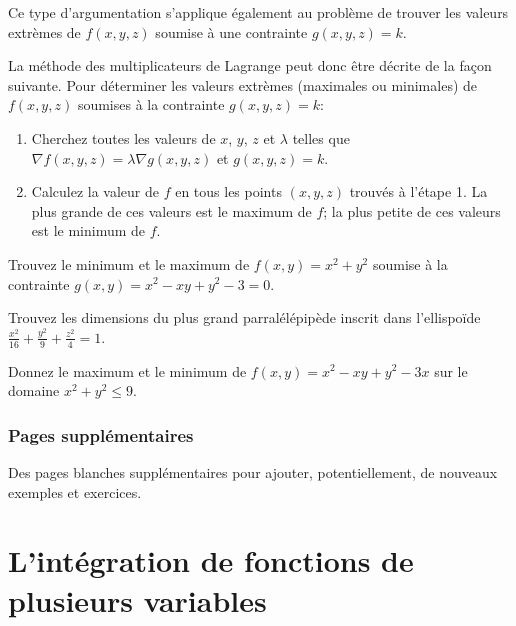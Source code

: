 \documentclass[]{book}
\theoremstyle{definition}
\theoremstyle{definition}
\theoremstyle{definition}
\theoremstyle{remark}
\let\BeginKnitrBlock\begin \let\EndKnitrBlock\end
\begin{document}
Ce type d'argumentation s'applique également au problème de trouver les
valeurs extrèmes de \(f(x,y,z)\) soumise à une contrainte
\(g(x,y,z)=k\).

La méthode des multiplicateurs de Lagrange peut donc être décrite de la
façon suivante. Pour déterminer les valeurs extrèmes (maximales ou
minimales) de \(f(x,y,z)\) soumises à la contrainte \(g(x,y,z)=k\):

\begin{enumerate}
\def\labelenumi{\arabic{enumi}.}
\item
  Cherchez toutes les valeurs de \(x\), \(y\), \(z\) et \(\lambda\)
  telles que \(\nabla f(x,y,z) = \lambda \nabla g(x,y,z)\) et
  \(g(x,y,z)=k\).
\item
  Calculez la valeur de \(f\) en tous les points \((x,y,z)\) trouvés à
  l'étape 1. La plus grande de ces valeurs est le maximum de \(f\); la
  plus petite de ces valeurs est le minimum de \(f\).
\end{enumerate}

\BeginKnitrBlock{example}
\protect\hypertarget{exm:unnamed-chunk-235}{}{\label{exm:unnamed-chunk-235}
}Trouvez le minimum et le maximum de \(f(x,y)=x^2+y^2\) soumise à la
contrainte \(g(x,y)=x^2-xy+y^2-3=0\).
\EndKnitrBlock{example}
\vspace*{8cm}

\BeginKnitrBlock{example}
\protect\hypertarget{exm:unnamed-chunk-236}{}{\label{exm:unnamed-chunk-236}
}Trouvez les dimensions du plus grand parralélépipède inscrit dans
l'ellispoïde \(\frac{x^2}{16}+\frac{y^2}{9}+\frac{z^2}{4}=1\).
\EndKnitrBlock{example}
\vspace*{8cm}

\BeginKnitrBlock{example}
\protect\hypertarget{exm:unnamed-chunk-237}{}{\label{exm:unnamed-chunk-237}
}Donnez le maximum et le minimum de \(f(x,y)=x^2-xy+y^2-3x\) sur le
domaine \(x^2+y^2\leq 9\).
\EndKnitrBlock{example}
\vspace*{8cm}

\hypertarget{pages-supplementaires-5}{%
\section{Pages supplémentaires}\label{pages-supplementaires-5}}

Des pages blanches supplémentaires pour ajouter, potentiellement, de
nouveaux exemples et exercices.


\hypertarget{part-lintegration-de-fonctions-de-plusieurs-variables}{%
\part{L'intégration de fonctions de plusieurs
variables}\label{part-lintegration-de-fonctions-de-plusieurs-variables}}
\end{document}
